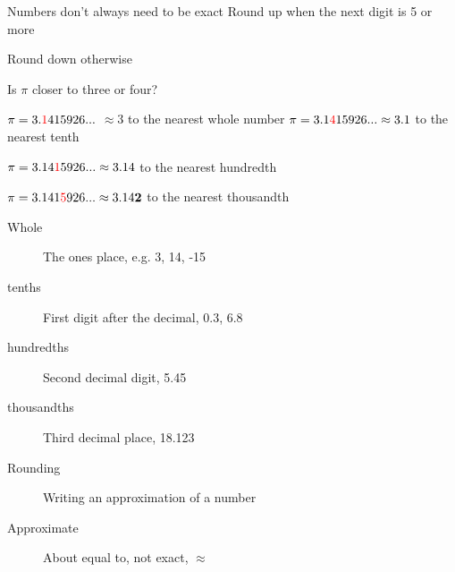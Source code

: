 \begin{frame}{Numbers don't always need to be exact}
    Round up when the next digit is 5 or more \par 
    Round down otherwise \par
     {\hspace{4cm}Is $\pi$ closer to three or four?} \par
        $\pi = 3.{\color{red}1}415926... $
     $\approx 3$ to the nearest whole number
     $\pi = 3.1{\color{red}4}15926... \approx 3.1$ to the nearest tenth \par
        $\pi = 3.14{\color{red}1}5926... \approx 3.14$ to the nearest hundredth \par
        $\pi = 3.141{\color{red}5}926... \approx 3.14{\textbf 2}$ to the nearest thousandth \bigskip
        \begin{description}
        \item[Whole] The ones place, e.g. 3, 14, -15
        \item[tenths] First digit after the decimal, 0.3, 6.8
        \item[hundredths] Second decimal digit, 5.45
        \item[thousandths] Third decimal place, 18.123
        \item[Rounding] Writing an approximation of a number
        \item[Approximate] About equal to, not exact, $\approx$
    \end{description}
    \end{frame}


